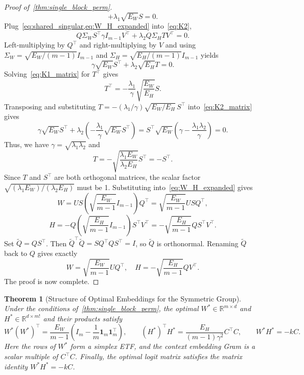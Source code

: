 \documentclass[11pt]{article}
\newtheorem{theorem}{Theorem}
\begin{document}
\begin{proof}[Proof of~\cref{thm:single_block_perm}]
\begin{equation}
  + \lambda_1\sqrt{E_W} S 
  = 0.
\end{equation}
Plug~\cref{eq:shared_singular,eq:W_H_expanded} into~\cref{eq:K2},
\[
  Q \Sigma_W S^{\top}\gamma I_{m-1} V^{\top}
  + \lambda_2 Q \Sigma_H T V^{\top}=0.
\]
Left-multiplying by \(Q^{\top}\) and right-multiplying by \(V\) and using \(\Sigma_W=\sqrt{E_W/(m-1)} I_{m-1}\)  and \(\Sigma_H=\sqrt{E_H/(m-1)} I_{m-1}\) yields
\begin{equation}\label{eq:K2_matrix}
  \gamma \sqrt{E_W} S^{\top}
  + \lambda_2 \sqrt{E_H} T 
  = 0.
\end{equation}
Solving~\cref{eq:K1_matrix} for \(T^{\top}\) gives
\[
  T^{\top}  =  -\frac{\lambda_1}{\gamma}\sqrt{\frac{E_W}{E_H}} S.
\]
Transposing and substituting \(T = -(\lambda_1/\gamma)\sqrt{E_W/E_H}\, S^{\top}\) into~\cref{eq:K2_matrix} gives
\[
  \gamma \sqrt{E_W} S^{\top}
  + \lambda_2\left(-\frac{\lambda_1}{\gamma}\sqrt{E_W} S^{\top}\right)
   = S^{\top} \sqrt{E_W} \left(\gamma - \frac{\lambda_1 \lambda_2}{\gamma}\right) = 0.
\]
Thus, we have \( \gamma = \sqrt{\lambda_1 \lambda_2} \) and
\[
T = -\sqrt{\frac{\lambda_1 E_W}{\lambda_2 E_H}} S^{\top} = - S^\top.
\]
Since \( T \) and \( S^\top \) are both orthogonal matrices, the scalar factor \(\sqrt{(\lambda_1 E_W)/(\lambda_2 E_H)}\) must be 1.
Substituting into~\cref{eq:W_H_expanded} gives
\[
  W = U S \left(\sqrt{ \frac{E_W}{m-1}} I_{m-1}\right) Q^{\top}
    = \sqrt{ \frac{E_W}{m-1}} U S Q^{\top},
\]
\[
  H = - Q \left(\sqrt{ \frac{E_H}{m-1}} I_{m-1}\right) S^{\top}V^{\top}
    = -\sqrt{ \frac{E_H}{m-1}} Q S^{\top} V^{\top}.
\]
Set \(\widetilde Q = Q S^{\top}\).  Then
\(\widetilde Q^{\top}\widetilde Q = S Q^{\top}Q S^{\top}=I\), so
\(\widetilde Q\) is orthonormal. 
Renaming \(\widetilde Q\) back to \(Q\) gives exactly
\[
  W=\sqrt{\frac{E_W}{m-1}} UQ^\top,
  \quad
  H=-\sqrt{\frac{E_H}{m-1}} QV^\top.
\]
The proof is now complete.
\end{proof}

\begin{theorem}[Structure of Optimal Embeddings for the Symmetric Group]
\label{thm:embedding_products_structure}
Under the conditions of~\cref{thm:single_block_perm}, the optimal \(W^* \in \mathbb{R}^{m\times d}\) and \(H^* \in \mathbb{R}^{d\times m!}\) and their products satisfy
\[
  W^*(W^*)^\top=\frac{E_W}{m-1} \left(I_m-\frac{1}{m}\boldsymbol{1}_m\boldsymbol{1}_m^\top\right),\qquad
  (H^*)^\top H^*=\frac{E_H}{(m-1)\gamma^2} C^\top C,\qquad
  W^*H^*=-kC.
\]
Here the rows of \(W^*\) form a simplex ETF, and the context embedding Gram is a scalar multiple of \(C^\top C\). Finally, the optimal logit matrix satisfies the matrix identity \(W^*H^*=-kC\).
\end{theorem}
\end{document}
